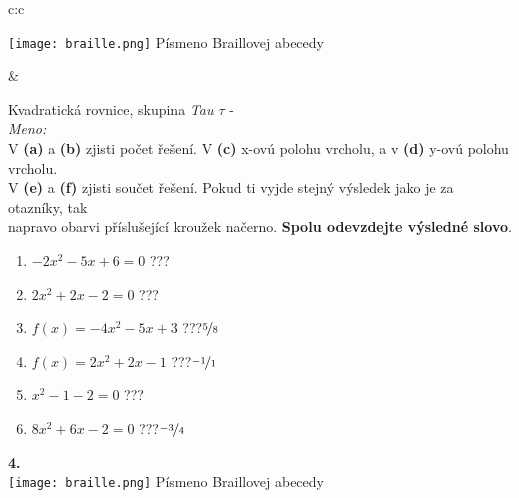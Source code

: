 \documentclass[10pt]{report}
\begin{document}
\begin{tabular}{c:c}
\begin{minipage}[c][99mm][t]{0.49\linewidth}
\begin{center}
\begin{minipage}{0.20\linewidth}
\begin{center}
\texttt{[image: braille.png]}
{\small Písmeno Braillovej abecedy}
\end{center}
\end{minipage}
\end{center}
\end{minipage}
&
\begin{minipage}[c][99mm][t]{0.49\linewidth}
\begin{center}
\vspace{7mm}
{\huge Kvadratická rovnice, skupina \textit{Tau $\tau$} -}\\[4.5mm]
\textit{Meno:}\phantom{xxxxxxxxxxxxxxxxxxxxxxxxxxxxxxxxxxxxxxxxxxxxxxxxxxxxxxxxxxxxxxxxx}\\[3.5mm]
V \textbf{(a)} a \textbf{(b)} zjisti počet řešení. V \textbf{(c)} x-ovú polohu vrcholu, a v \textbf{(d)} y-ovú polohu vrcholu.\\V \textbf{(e)} a \textbf{(f)} zjisti součet řešení. Pokud ti vyjde stejný výsledek jako je za otazníky, tak\\napravo obarvi příslušející kroužek načerno. \textbf{Spolu odevzdejte výsledné slovo}.\\[3mm]
\begin{minipage}{0.77\linewidth}
\begin{center}
\begin{varwidth}{\textwidth}
\begin{enumerate}
\large
\item $-2x^2-5x+6=0$\quad \dotfill\; ???\;\dotfill {}
\item $2x^2+2x-2=0$\quad \dotfill\; ???\;\dotfill {}
\item $f(x)=-4x^2-5x+3$\quad \dotfill\; ???\;\dotfill \quad $\nicefrac{5}{8}$
\item $f(x)=2x^2+2x-1$\quad \dotfill\; ???\;\dotfill \quad $\nicefrac{-1}{1}$
\item $x^2-1-2=0$\quad \dotfill\; ???\;\dotfill {}
\item $8x^2+6x-2=0$\quad \dotfill\; ???\;\dotfill \quad $\nicefrac{-3}{4}$
\end{enumerate}
\end{varwidth}
\end{center}
\end{minipage}
\begin{minipage}{0.20\linewidth}
\begin{center}
{\Huge\bfseries 4.} \\[2mm]
\texttt{[image: braille.png]}
{\small Písmeno Braillovej abecedy}
\end{center}
\end{minipage}
\end{center}
\end{minipage}

\end{tabular}
\end{document}
